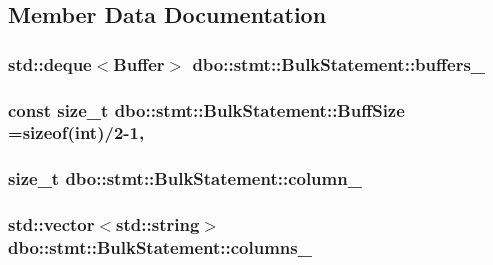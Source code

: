 \subsection{Member Data Documentation}
\hypertarget{classdbo_1_1stmt_1_1_bulk_statement_a13929be97455dc9cd060c50bcae537cf}{
\subsubsection[{buffers\+\_\+}]{\setlength{\rightskip}{0pt plus 5cm}std\+::deque$<${\bf Buffer}$>$ dbo\+::stmt\+::\+Bulk\+Statement\+::buffers\+\_\+\hspace{0.3cm}{\ttfamily [protected]}}}\label{classdbo_1_1stmt_1_1_bulk_statement_a13929be97455dc9cd060c50bcae537cf}
\hypertarget{classdbo_1_1stmt_1_1_bulk_statement_a89930e2b8db959d397c099d37a4d7a59}{
\subsubsection[{Buff\+Size}]{\setlength{\rightskip}{0pt plus 5cm}const size\+\_\+t dbo\+::stmt\+::\+Bulk\+Statement\+::\+Buff\+Size =sizeof(int)/2-\/1\hspace{0.3cm}{\ttfamily [static]}, {\ttfamily [protected]}}}\label{classdbo_1_1stmt_1_1_bulk_statement_a89930e2b8db959d397c099d37a4d7a59}
\hypertarget{classdbo_1_1stmt_1_1_bulk_statement_aa4fe97f33a962eb6fd063537881a6607}{
\subsubsection[{column\+\_\+}]{\setlength{\rightskip}{0pt plus 5cm}size\+\_\+t dbo\+::stmt\+::\+Bulk\+Statement\+::column\+\_\+\hspace{0.3cm}{\ttfamily [protected]}}}\label{classdbo_1_1stmt_1_1_bulk_statement_aa4fe97f33a962eb6fd063537881a6607}
\hypertarget{classdbo_1_1stmt_1_1_bulk_statement_a6879423d29e1b68dbe1039aad61a33bd}{
\subsubsection[{columns\+\_\+}]{\setlength{\rightskip}{0pt plus 5cm}std\+::vector$<$std\+::string$>$ dbo\+::stmt\+::\+Bulk\+Statement\+::columns\+\_\+\hspace{0.3cm}{\ttfamily [protected]}}}\label{classdbo_1_1stmt_1_1_bulk_statement_a6879423d29e1b68dbe1039aad61a33bd}
